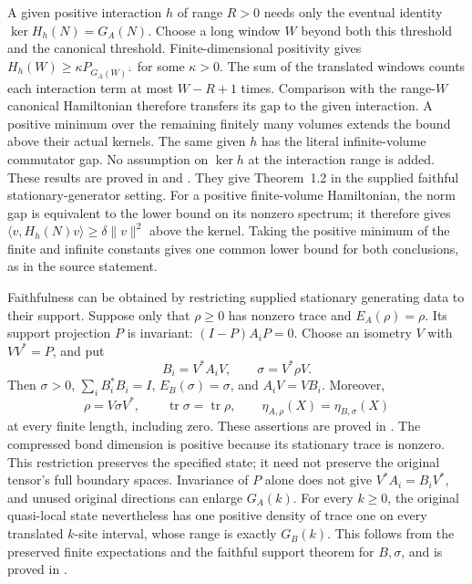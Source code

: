 \documentclass{article}
\begin{document}
A given positive interaction $h$ of range $R>0$ needs only the eventual
identity $\ker H_h(N)=G_A(N)$. Choose a long window $W$ beyond both this
threshold and the canonical threshold. Finite-dimensional positivity gives
$H_h(W)\geq\kappa P_{G_A(W)^\perp}$ for some $\kappa>0$.
The sum of the translated windows counts each interaction term at most
$W-R+1$ times. Comparison with the range-$W$ canonical Hamiltonian therefore
transfers its gap to the given interaction. A positive minimum over the
remaining finitely many volumes extends the bound above their actual
kernels. The same given $h$ has the literal infinite-volume commutator gap.
No assumption on $\ker h$ at the interaction range is added. These results
are proved in
and
.
They give Theorem~1.2 in the supplied faithful stationary-generator setting.
For a positive finite-volume Hamiltonian, the norm gap is equivalent to
the lower bound on its nonzero spectrum; it therefore gives
$\langle v,H_h(N)v\rangle\geq\delta\|v\|^2$ above the kernel.
Taking the positive minimum of the finite and infinite constants gives one
common lower bound for both conclusions, as in the source statement.

Faithfulness can be obtained by restricting supplied stationary generating
data to their support. Suppose only that $\rho\geq0$ has nonzero trace and
$E_A(\rho)=\rho$. Its support projection $P$ is invariant:
$(I-P)A_iP=0$. Choose an isometry $V$ with $VV^*=P$, and put
\[
 B_i=V^*A_iV,\qquad \sigma=V^*\rho V.
\]
Then $\sigma>0$, $\sum_iB_i^*B_i=I$, $E_B(\sigma)=\sigma$, and
$A_iV=VB_i$. Moreover,
\[
 \rho=V\sigma V^*,\qquad
 \operatorname{tr}\sigma=\operatorname{tr}\rho,\qquad
 \eta_{A,\rho}(X)=\eta_{B,\sigma}(X)
\]
at every finite length, including zero. These assertions are proved in
.
The compressed bond dimension is positive because its stationary trace is
nonzero. This restriction preserves the specified state; it need not preserve
the original tensor's full boundary spaces. Invariance of $P$ alone does not
give $V^*A_i=B_iV^*$, and unused original directions can enlarge $G_A(k)$.
For every $k\geq0$, the original quasi-local state nevertheless has one
positive density of trace one on every translated $k$-site interval, whose
range is exactly $G_B(k)$. This follows from the preserved finite expectations
and the faithful support theorem for $B,\sigma$, and is proved in
.
\end{document}
